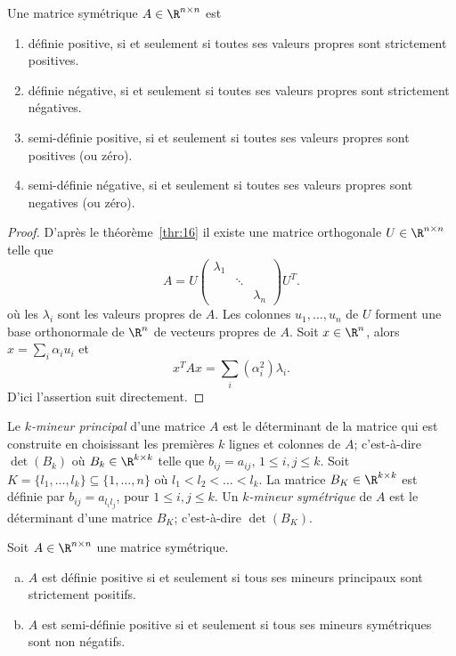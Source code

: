 \begin{theorem}
  \label{thr:15}
  Une matrice symétrique $A \in \R^{n \times n}$ est 
  \begin{enumerate}
  \item définie positive,
    si et seulement si toutes ses valeurs propres sont strictement positives. 
  \item définie négative, si et seulement si toutes ses valeurs propres sont strictement négatives. 
  \item semi-définie positive, si et seulement si toutes ses valeurs propres sont positives (ou zéro).  
  \item semi-définie négative, si et seulement si toutes ses valeurs propres sont negatives (ou zéro).  
  \end{enumerate}
\end{theorem}

\begin{proof}
  D'après le théorème~\ref{thr:16} il existe une 
  matrice orthogonale $U \in \R^{n\times n}$ telle que 
  \begin{equation}
    \label{eq:10}    
    A = U
    \begin{pmatrix}
      \lambda_1 \\
      & \ddots \\
      && \lambda_n
    \end{pmatrix} U^T. 
  \end{equation}
  où les $\lambda_i$ sont les valeurs propres de $A$. Les colonnes  $u_1,\dots,u_n$ de $U$ forment une base orthonormale de $\R^n$  de vecteurs propres de $A$. 
  Soit $x \in \R^n$, alors $x = \sum_i \alpha_i u_i$ et 
  \begin{displaymath}
    x^TAx = \sum_i (\alpha_i^2) \lambda_i.  
  \end{displaymath}
D'ici l'assertion suit directement. 
\end{proof}

Le \emph{$k$-mineur principal} d'une matrice $A$ est le déterminant de la matrice qui est construite en choisissant les premières $k$ lignes et colonnes de $A$; c'est-à-dire $\det(B_k)$ où $B_k \in \R^{k\times k}$ telle que $b_{ij} = a_{ij}$, $1 \leq i,j \leq k$. Soit $K  = \{l_1,\dots,l_k\}\subseteq \{1,\dots,n\}$ où $l_1<l_2<\dots<l_k$. 
La matrice $B_K \in \R^{k\times k}$  est définie par $b_{ij} = a_{l_il_j}$, pour $1 \leq i,j\leq k$. Un \emph{$k$-mineur symétrique} de $A$ est le déterminant d'une matrice $B_K$; c'est-à-dire $\det(B_K)$.  

\begin{theorem}
  \label{thr:17}
  Soit $A \in  \R^{n \times n}$ une matrice symétrique.   
  \begin{enumerate}[a)]
  \item $A$ \label{posdef:1}
    est définie positive si et seulement si tous ses mineurs
    principaux sont strictement positifs.
  \item $A$ \label{posdef:2}
    est semi-définie positive si et seulement si tous ses mineurs symétriques sont non
    négatifs.
  \end{enumerate}
\end{theorem}

